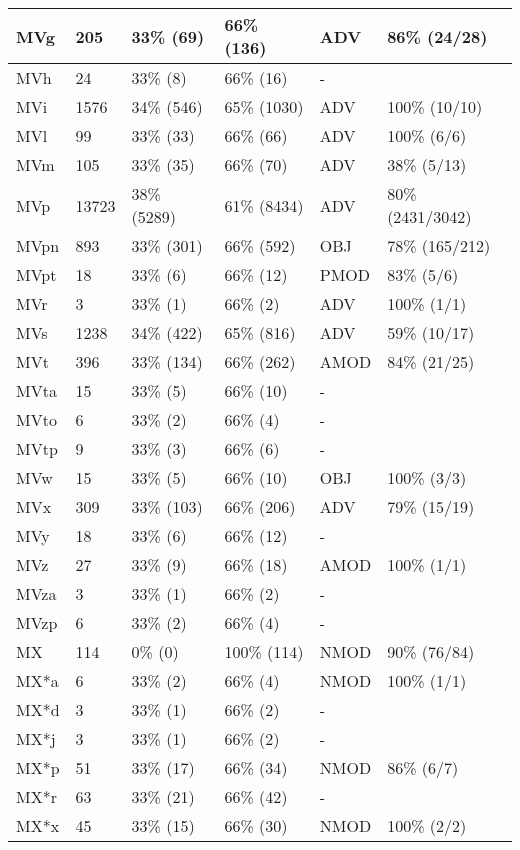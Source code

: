 \begin{figure*}
\begin{tabular}{|l|l|l|l||l|l|}
\hline
 MVg & 205 & 33\% (69) & 66\% (136) & ADV & 86\% (24/28) \\ 
\hline
 MVh & 24 & 33\% (8) & 66\% (16) & - &  \\ 
\hline
 MVi & 1576 & 34\% (546) & 65\% (1030) & ADV & 100\% (10/10) \\ 
\hline
 MVl & 99 & 33\% (33) & 66\% (66) & ADV & 100\% (6/6) \\ 
\hline
 MVm & 105 & 33\% (35) & 66\% (70) & ADV & 38\% (5/13) \\ 
\hline
 MVp & 13723 & 38\% (5289) & 61\% (8434) & ADV & 80\% (2431/3042) \\ 
\hline
 MVpn & 893 & 33\% (301) & 66\% (592) & OBJ & 78\% (165/212) \\ 
\hline
 MVpt & 18 & 33\% (6) & 66\% (12) & PMOD & 83\% (5/6) \\ 
\hline
 MVr & 3 & 33\% (1) & 66\% (2) & ADV & 100\% (1/1) \\ 
\hline
 MVs & 1238 & 34\% (422) & 65\% (816) & ADV & 59\% (10/17) \\ 
\hline
 MVt & 396 & 33\% (134) & 66\% (262) & AMOD & 84\% (21/25) \\ 
\hline
 MVta & 15 & 33\% (5) & 66\% (10) & - &  \\ 
\hline
 MVto & 6 & 33\% (2) & 66\% (4) & - &  \\ 
\hline
 MVtp & 9 & 33\% (3) & 66\% (6) & - &  \\ 
\hline
 MVw & 15 & 33\% (5) & 66\% (10) & OBJ & 100\% (3/3) \\ 
\hline
 MVx & 309 & 33\% (103) & 66\% (206) & ADV & 79\% (15/19) \\ 
\hline
 MVy & 18 & 33\% (6) & 66\% (12) & - &  \\ 
\hline
 MVz & 27 & 33\% (9) & 66\% (18) & AMOD & 100\% (1/1) \\ 
\hline
 MVza & 3 & 33\% (1) & 66\% (2) & - &  \\ 
\hline
 MVzp & 6 & 33\% (2) & 66\% (4) & - &  \\ 
\hline
 MX & 114 & 0\% (0) & 100\% (114) & NMOD & 90\% (76/84) \\ 
\hline
 MX*a & 6 & 33\% (2) & 66\% (4) & NMOD & 100\% (1/1) \\ 
\hline
 MX*d & 3 & 33\% (1) & 66\% (2) & - &  \\ 
\hline
 MX*j & 3 & 33\% (1) & 66\% (2) & - &  \\ 
\hline
 MX*p & 51 & 33\% (17) & 66\% (34) & NMOD & 86\% (6/7) \\ 
\hline
 MX*r & 63 & 33\% (21) & 66\% (42) & - &  \\ 
\hline
 MX*x & 45 & 33\% (15) & 66\% (30) & NMOD & 100\% (2/2) \\ 
\hline
\end{tabular}
\end{figure*}
